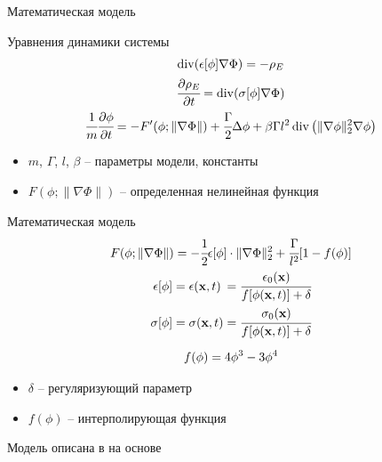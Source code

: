 \begin{frame}{Математическая модель}
\begin{block}{Уравнения динамики системы}
    \vspace{-2mm}
    \begin{gather*}
        \operatorname{{div}}(\epsilon[\phi] \nabla \Phi) = -\rho_E \\
        \cfrac{\partial \rho_E}{\partial t} = \operatorname{{div}}(\sigma[\phi] \nabla \Phi) \\
        \cfrac{1}{m} \cfrac{\partial \phi}{\partial t} = -F'( \phi; \| \nabla \Phi \|) + \cfrac{\Gamma}{2} \Delta \phi + \beta \Gamma l^2 \operatorname{{div}} \left( \| \nabla \phi \|_2^2 \nabla \phi \right)
    \end{gather*}
    \vspace{-4mm}
\end{block}
\begin{itemize}
    \item $m$, $\Gamma$, $l$, $\beta$ -- параметры модели, константы
    \item $F(\phi; \| \nabla \Phi \|)$ -- определенная нелинейная функция
\end{itemize}
\end{frame}


\begin{frame}{Математическая модель}
\vspace{-3mm}
\begin{gather*}
    F(\phi; \| \nabla \Phi \|) = -\cfrac{1}{2} \epsilon[\phi] \cdot \| \nabla \Phi \|_2^2 + \cfrac{\Gamma}{l^2} [1 - f(\phi)] \\
    \begin{alignedat}{3}
        \epsilon[\phi] &= \epsilon({\textbf{x}}, t) &&= \cfrac{\epsilon_0({\textbf{x}})}{f[\phi({\textbf{x}}, t)] + \delta} \\
        \sigma[\phi] &= \sigma({\textbf{x}}, t) &&= \cfrac{\sigma_0({\textbf{x}})}{f[\phi({\textbf{x}}, t)] + \delta}
    \end{alignedat} \\[2mm]
    f(\phi) = 4 \phi^3 - 3 \phi^4
\end{gather*}
\vspace{-6mm}
\begin{itemize}
    \item $\delta$ -- регуляризующий параметр
    \item $f(\phi)$ -- интерполирующая функция
\end{itemize}
\vspace{1mm}
\parind Модель описана в \cite{zipunova_computational} на основе \cite{pitike_dielectric_breakdown}
\end{frame}


